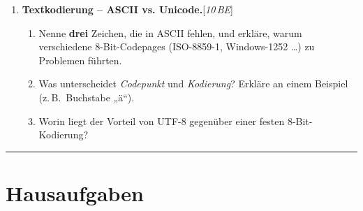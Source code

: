 \documentclass[11pt,a4paper]{scrartcl}
\newenvironment{aufgaben}{%
	\begin{enumerate}[leftmargin=*,label=\textbf{Aufgabe~\arabic*:}, itemsep=0.6em]
	}{\end{enumerate}}
\newcommand{\punkte}[1]{\hfill{\small[\textit{#1\,BE}]}}
\begin{document}
\begin{aufgaben}
		\item \textbf{Textkodierung – ASCII vs. Unicode.}\punkte{10}\\
		\begin{enumerate}[label*=\alph*)]
			\item Nenne \textbf{drei} Zeichen, die in ASCII fehlen, und erkläre, warum verschiedene 8-Bit-Codepages (ISO-8859-1, Windows-1252 \dots) zu Problemen führten.\\
			\item Was unterscheidet \emph{Codepunkt} und \emph{Kodierung}? Erkläre an einem Beispiel (z.\,B.\ Buchstabe „ä“).\\
			\item Worin liegt der Vorteil von UTF-8 gegenüber einer festen 8-Bit-Kodierung?
		\end{enumerate}
		
	\end{aufgaben}
	
	\vspace{0.3em}
	\hrule
	\vspace{0.6em}
	
	\section*{Hausaufgaben}
	
\end{document}
